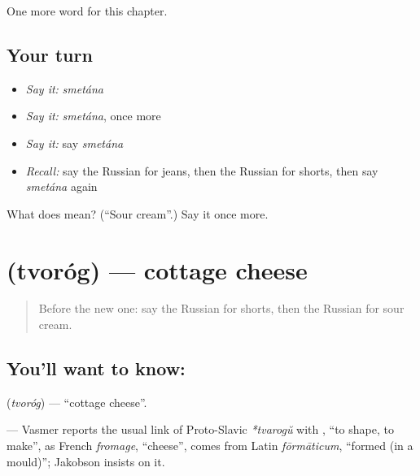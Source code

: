\begin{grammarlens}[title={What you've built}]
One more word for this chapter.
\end{grammarlens}

\subsection*{Your turn}
\begin{itemize}
\raggedright
  \item \emph{Say it:} \emph{smetána}
  \item \emph{Say it:} \emph{smetána}, once more
  \item \emph{Say it:} say \emph{smetána}
  \item \emph{Recall:} say the Russian for jeans, then the Russian for shorts, then say \emph{smetána} again
\end{itemize}

\begin{tcolorbox}[breakable,colback=teal!4,colframe=teal!35!black,title={Before you move on}]
What does  mean? (\textquotedblleft{}Sour cream\textquotedblright{}.) Say it once more.
\end{tcolorbox}
\section[\texorpdfstring{\ru{творог} (tvoróg)}{творог (tvoróg)}]{ (tvoróg) — cottage cheese}

\label{lesson:RU-C249-tvorog}



\begin{quote}
Before the new one: say the Russian for shorts, then the Russian for sour cream.
\end{quote}

\subsection*{You'll want to know: }
\textbf{} (\emph{tvoróg}) — \textquotedblleft{}cottage cheese\textquotedblright{}.

\begin{cousinweb}
\textbf{} — Vasmer reports the usual link of Proto-Slavic \emph{*tvarogŭ} with \emph{}, \textquotedblleft{}to shape, to make\textquotedblright{}, as French \emph{fromage}, \textquotedblleft{}cheese\textquotedblright{}, comes from Latin \emph{fōrmāticum}, \textquotedblleft{}formed (in a mould)\textquotedblright{}; Jakobson insists on it.
\end{cousinweb}

